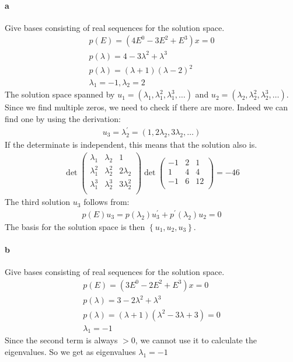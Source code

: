 \paragraph{a}
Give bases consisting of real sequences for the solution space.
\begin{gather*}
p(E) = (4E^0 - 3E^2 + E^3)x =0 \\
p(\lambda) = 4 - 3 \lambda^2 + \lambda^3 \\
p(\lambda) = (\lambda +1) ( \lambda -2 )^2\\
\lambda_1 = -1 , \lambda_2 = 2
\end{gather*}
The solution space spanned by $u_1 = ( \lambda_1 ,\lambda_1^2 ,\lambda_1^3, \ldots )$ and $u_2 =( \lambda_2 ,\lambda_2^2 ,\lambda_2^3, \ldots ) $.
Since we find multiple zeros, we need to check if there are more. Indeed we can find one by using the derivation:
\begin{gather*}
u_3 = \lambda_2^{'} = ( 1,2\lambda_2,3\lambda_2, \ldots)
\end{gather*}
If the determinate is independent, this means that the solution also is.
\begin{gather*}
\det \left( \begin{array}{ccc}
\lambda_1 & \lambda_2 & 1\\
\lambda_1^2 & \lambda_2^2 & 2 \lambda_2 \\
\lambda_1^3 & \lambda_2^3 & 3 \lambda_2 ^2\\
\end{array}\right) 
\det \left( \begin{array}{ccc}
-1 & 2 & 1\\
1 & 4 & 4 \\
-1 & 6 & 12 \\
\end{array}\right)= -46
\end{gather*}
The third solution $u_3$ follows from:
\begin{gather*}
p(E)u_3 = p(\lambda_2) u_3^{'} + p^{'}(\lambda_2) u_2 = 0 
\end{gather*}
The basis for the solution space is then $\left\lbrace u_1,u_2,u_3 \right\rbrace$.
\paragraph{b}
Give bases consisting of real sequences for the solution space.
\begin{gather*}
p(E) = (3E^0 - 2E^2 + E^3)x =0 \\
p(\lambda) = 3 - 2 \lambda^2 + \lambda^3 \\
p(\lambda) = (\lambda + 1)(\lambda^2 - 3 \lambda +3 ) = 0\\
\lambda_1  = -1
\end{gather*}
Since the second term is always $>0$, we cannot use it to calculate the eigenvalues. So we get as eigenvalues $\lambda_1 = -1$
